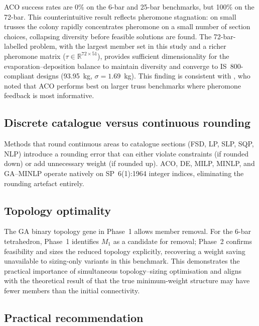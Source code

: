 \documentclass[lineno,pdflatex,sn-mathphys-num]{sn-jnl}
\begin{document}
ACO success rates are 0\% on the 6-bar and 25-bar benchmarks,
but 100\% on the 72-bar. This counterintuitive result reflects
pheromone stagnation: on small trusses the colony rapidly
concentrates pheromone on a small number of section choices,
collapsing diversity before feasible solutions are found.
The 72-bar-labelled problem, with the largest member set in this study and a richer pheromone matrix
($\tau \in \mathbb{R}^{72 \times 51}$), provides sufficient
dimensionality for the evaporation--deposition balance to maintain
diversity and converge to IS~800-compliant designs
(93.95~kg, $\sigma=1.69$~kg).
This finding is consistent with \citet{Camp2004}, who noted that
ACO performs best on larger truss benchmarks where pheromone
feedback is most informative.

\subsection{Discrete catalogue versus continuous rounding}

Methods that round continuous areas to catalogue sections (FSD, LP, SLP,
SQP, NLP) introduce a rounding error that can either violate constraints
(if rounded down) or add unnecessary weight (if rounded up).
ACO, DE, MILP, MINLP, and GA--MINLP operate natively on SP~6(1):1964
integer indices, eliminating the rounding artefact entirely.

\subsection{Topology optimality}

The GA binary topology gene in Phase~1 allows member removal.
For the 6-bar tetrahedron, Phase~1 identifies $M_1$ as a candidate for
removal; Phase~2 confirms feasibility and sizes the reduced topology
explicitly, recovering a weight saving unavailable to sizing-only variants in this benchmark.
This demonstrates the practical importance of simultaneous
topology--sizing optimisation and aligns with the theoretical result of
\citet{Dorn1964} that the true minimum-weight structure may have fewer
members than the initial connectivity.

\subsection{Practical recommendation}
\end{document}
